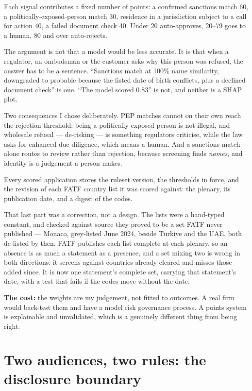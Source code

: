 \documentclass[11pt,a4paper]{article}
\begin{document}
Each signal contributes a fixed number of points: a confirmed sanctions match
60, a politically-exposed-person match 30, residence in a jurisdiction subject
to a call for action 40, a failed document check 40. Under 20 auto-approves,
20--79 goes to a human, 80 and over auto-rejects.

The argument is not that a model would be less accurate. It is that when a
regulator, an ombudsman or the customer asks why this person was refused, the
answer has to be a sentence. ``Sanctions match at 100\% name similarity,
downgraded to probable because the listed date of birth conflicts, plus a
declined document check'' is one. ``The model scored 0.83'' is not, and neither
is a SHAP plot.

Two consequences I chose deliberately. PEP matches cannot on their own reach
the rejection threshold: being a politically exposed person is not illegal, and
wholesale refusal --- de-risking --- is something regulators criticise, while
the law asks for enhanced due diligence, which means a human. And a sanctions
match alone routes to review rather than rejection, because screening finds
\emph{names}, and identity is a judgement a person makes.

Every scored application stores the ruleset version, the thresholds in force,
and the revision of each FATF country list it was scored against: the plenary,
its publication date, and a digest of the codes.

That last part was a correction, not a design. The lists were a hand-typed
constant, and checked against source they proved to be a set FATF never
published --- Monaco, grey-listed June 2024, beside T\"urkiye and the UAE, both
de-listed by then. FATF publishes each list complete at each plenary, so an
absence is as much a statement as a presence, and a set mixing two is wrong in
both directions: it screens against countries already cleared and misses those
added since. It is now one statement's complete set, carrying that statement's
date, with a test that fails if the codes move without the date.

\textbf{The cost:} the weights are my judgement, not fitted to outcomes. A real
firm would back-test them and have a model risk governance process. A points
system is explainable and unvalidated, which is a genuinely different thing from
being right.

\section{Two audiences, two rules: the disclosure boundary}
\end{document}
